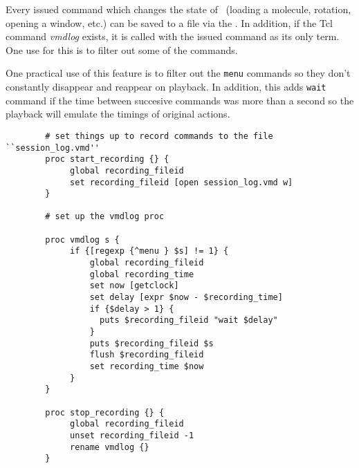 Every issued command which changes the state of \VMD\ (loading a
molecule, rotation, opening a window, etc.) can be saved to a file via
the .  In addition, if the Tcl
command {\it vmdlog} exists, it is called with the issued command as
its only term.  One use for this is to filter out some of the
commands.

One practical use of this feature is to filter out the {\tt menu}
commands so they don't constantly disappear and reappear on playback.
In addition, this adds {\tt wait} command if the time between
succesive commands was more than a second so the playback will emulate
the timings of original actions.

\begin{verbatim}
        # set things up to record commands to the file ``session_log.vmd''
        proc start_recording {} {
             global recording_fileid
             set recording_fileid [open session_log.vmd w]
        }

        # set up the vmdlog proc

        proc vmdlog s {
             if {[regexp {^menu } $s] != 1} {
                 global recording_fileid
                 global recording_time
                 set now [getclock]
                 set delay [expr $now - $recording_time]
                 if {$delay > 1} {
                   puts $recording_fileid "wait $delay"
                 }
                 puts $recording_fileid $s
                 flush $recording_fileid
                 set recording_time $now
             }
        }

        proc stop_recording {} {
             global recording_fileid
             unset recording_fileid -1
             rename vmdlog {}
        }
\end{verbatim}

